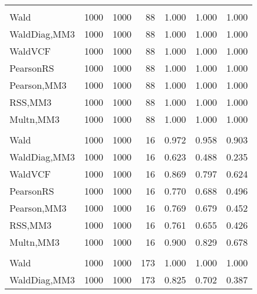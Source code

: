 \documentclass[
]{article}
\begin{document}
\begin{table}[H]
{\begin{tabular}[t]{lrrrrrr}
\addlinespace[0.3em]
\multicolumn{7}{l}{\textbf{1F 15V}}\\
\hspace{1em}Wald & 1000 & 1000 & 88 & 1.000 & 1.000 & 1.000\\
\hspace{1em}WaldDiag,MM3 & 1000 & 1000 & 88 & 1.000 & 1.000 & 1.000\\
\hspace{1em}WaldVCF & 1000 & 1000 & 88 & 1.000 & 1.000 & 1.000\\
\hspace{1em}PearsonRS & 1000 & 1000 & 88 & 1.000 & 1.000 & 1.000\\
\hspace{1em}Pearson,MM3 & 1000 & 1000 & 88 & 1.000 & 1.000 & 1.000\\
\hspace{1em}RSS,MM3 & 1000 & 1000 & 88 & 1.000 & 1.000 & 1.000\\
\hspace{1em}Multn,MM3 & 1000 & 1000 & 88 & 1.000 & 1.000 & 1.000\\
\addlinespace[0.3em]
\multicolumn{7}{l}{\textbf{2F 10V}}\\
\hspace{1em}Wald & 1000 & 1000 & 16 & 0.972 & 0.958 & 0.903\\
\hspace{1em}WaldDiag,MM3 & 1000 & 1000 & 16 & 0.623 & 0.488 & 0.235\\
\hspace{1em}WaldVCF & 1000 & 1000 & 16 & 0.869 & 0.797 & 0.624\\
\hspace{1em}PearsonRS & 1000 & 1000 & 16 & 0.770 & 0.688 & 0.496\\
\hspace{1em}Pearson,MM3 & 1000 & 1000 & 16 & 0.769 & 0.679 & 0.452\\
\hspace{1em}RSS,MM3 & 1000 & 1000 & 16 & 0.761 & 0.655 & 0.426\\
\hspace{1em}Multn,MM3 & 1000 & 1000 & 16 & 0.900 & 0.829 & 0.678\\
\addlinespace[0.3em]
\multicolumn{7}{l}{\textbf{3F 15V}}\\
\hspace{1em}Wald & 1000 & 1000 & 173 & 1.000 & 1.000 & 1.000\\
\hspace{1em}WaldDiag,MM3 & 1000 & 1000 & 173 & 0.825 & 0.702 & 0.387\\

\end{tabular}}
\end{table}
\end{document}
